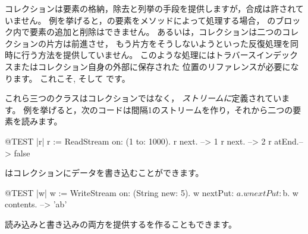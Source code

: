 \documentclass[a4paper,10pt,twoside]{book}
\begin{document}
コレクションは要素の格納，除去と列挙の手段を提供しますが，合成は許されていません。
例を挙げると，の要素をメソッドによって処理する場合，
のブロック内で要素の追加と削除はできません。
あるいは，コレクションは二つのコレクションの片方は前進させ，
もう片方をそうしないようといった反復処理を同時に行う方法を提供していません。
このような処理にはトラバースインデックスまたはコレクション自身の外部に保存された
位置のリファレンスが必要になります。
これこそ,   そして です。



これら三つのクラスはコレクションではなく， \emph{ストリームに}定義されています。
例を挙げると，次のコードは間隔1のストリームを作り，それから二つの要素を読みます。


\begin{code}{@TEST |r|}
r := ReadStream on: (1 to: 1000).
r next.   --> 1
r next.   --> 2
r atEnd.--> false
\end{code}

はコレクションにデータを書き込むことができます。


\begin{code}{@TEST |w|}
w := WriteStream on: (String new: 5).
w nextPut: $a.
w nextPut: $b.
w contents. -->  'ab'
\end{code}

読み込みと書き込みの両方を提供するを作ることもできます。
\end{document}
